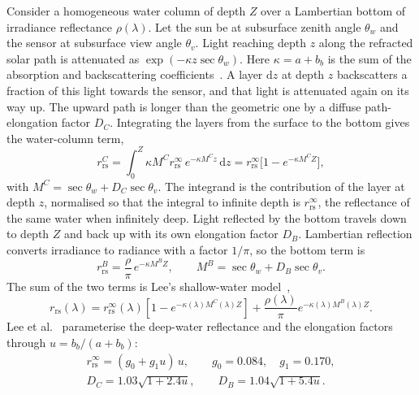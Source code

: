 \documentclass[remotesensing,article,submit,pdftex]{Definitions/mdpi}
\begin{document}
Consider a homogeneous water column of depth $Z$ over a Lambertian bottom of irradiance reflectance $\rho(\lambda)$. Let the sun be at subsurface zenith angle $\theta_w$ and the sensor at subsurface view angle $\theta_v$. Light reaching depth $z$ along the refracted solar path is attenuated as $\exp(-\kappa z \sec\theta_w)$. Here $\kappa = a + b_b$ is the sum of the absorption and backscattering coefficients~\cite{lee1998}. A layer $\mathrm{d}z$ at depth $z$ backscatters a fraction of this light towards the sensor, and that light is attenuated again on its way up. The upward path is longer than the geometric one by a diffuse path-elongation factor $D_C$. Integrating the layers from the surface to the bottom gives the water-column term,
\begin{equation}
r_\mathrm{rs}^{C} = \int_0^{Z} \kappa M^C r_\mathrm{rs}^\infty\, e^{-\kappa M^C z}\,\mathrm{d}z = r_\mathrm{rs}^\infty \bigl[1 - e^{-\kappa M^C Z}\bigr],
\end{equation}
with $M^C = \sec\theta_w + D_C \sec\theta_v$. The integrand is the contribution of the layer at depth $z$, normalised so that the integral to infinite depth is
$r_\mathrm{rs}^\infty$, the reflectance of the same water when infinitely deep. Light reflected by the bottom travels down to depth $Z$ and back up with its own elongation factor $D_B$. Lambertian reflection converts irradiance to radiance with a factor $1/\pi$, so the bottom term is
\begin{equation}
r_\mathrm{rs}^{B} = \frac{\rho}{\pi}\, e^{-\kappa M^B Z}, \qquad M^B = \sec\theta_w + D_B \sec\theta_v .
\end{equation}
The sum of the two terms is Lee's shallow-water model~\cite{lee1998,lee1999,maritorena1994},
\begin{equation}
r_\mathrm{rs}(\lambda) = r_\mathrm{rs}^\infty(\lambda)\left[1 - e^{-\kappa(\lambda) M^C(\lambda) Z}\right] + \frac{\rho(\lambda)}{\pi} e^{-\kappa(\lambda) M^B(\lambda) Z}. \label{eq:lee}
\end{equation}
Lee et al.~\cite{lee1999} parameterise the deep-water reflectance and the elongation factors through $u = b_b/(a + b_b)$:
\begin{equation}
\begin{gathered}
r_\mathrm{rs}^\infty = (g_0 + g_1 u)\,u, \qquad g_0 = 0.084,\quad g_1 = 0.170,\\
D_C = 1.03\sqrt{1 + 2.4u}, \qquad D_B = 1.04\sqrt{1 + 5.4u}.
\end{gathered} \label{eq:u}
\end{equation}
\end{document}
